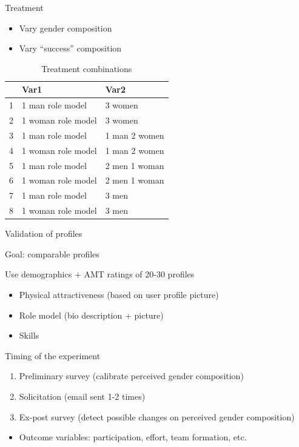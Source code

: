 \begin{frame}{Treatment}

\begin{itemize}
\tightlist
\item
  Vary gender composition
\item
  Vary ``success'' composition
\end{itemize}

\begin{table}[ht]
\centering
\begin{tabular}{rll}
  \hline
 & Var1 & Var2 \\ 
  \hline
1 & 1 man role model & 3 women \\ 
  2 & 1 woman role model & 3 women \\ 
  3 & 1 man role model & 1 man 2 women \\ 
  4 & 1 woman role model & 1 man 2 women \\ 
  5 & 1 man role model & 2 men 1 woman \\ 
  6 & 1 woman role model & 2 men 1 woman \\ 
  7 & 1 man role model & 3 men \\ 
  8 & 1 woman role model & 3 men \\ 
   \hline
\end{tabular}
\caption{Treatment combinations} 
\end{table}

\end{frame}

\begin{frame}{Validation of profiles}

Goal: comparable profiles

Use demographics + AMT ratings of 20-30 profiles

\begin{itemize}
\tightlist
\item
  Physical attractiveness (based on user profile picture)
\item
  Role model (bio description + picture)
\item
  Skills
\end{itemize}

\end{frame}

\begin{frame}{Timing of the experiment}

\begin{enumerate}
\def\labelenumi{\arabic{enumi}.}
\tightlist
\item
  Preliminary survey (calibrate perceived gender composition)
\item
  Solicitation (email sent 1-2 times)
\item
  Ex-post survey (detect possible changes on perceived gender
  composition)
\end{enumerate}

\begin{itemize}
\tightlist
\item
  Outcome variables: participation, effort, team formation, etc.
\end{itemize}

\end{frame}

